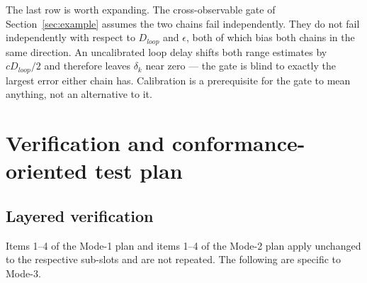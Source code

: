 \documentclass[11pt,a4paper]{article}
\begin{document}
The last row is worth expanding. The cross-observable gate of Section~\ref{sec:example} assumes the
two chains fail independently. They do not fail independently with respect to $D_{loop}$ and
$\epsilon$, both of which bias both chains in the same direction. An uncalibrated loop delay shifts
both range estimates by $cD_{loop}/2$ and therefore leaves $\delta_k$ near zero --- the gate is blind
to exactly the largest error either chain has. Calibration is a prerequisite for the gate to mean
anything, not an alternative to it.

\section{Verification and conformance-oriented test plan}
\label{sec:verify}

\subsection{Layered verification}

Items 1--4 of the Mode-1 plan and items 1--4 of the Mode-2 plan apply unchanged to the respective
sub-slots and are not repeated. The following are specific to Mode-3.
\end{document}
